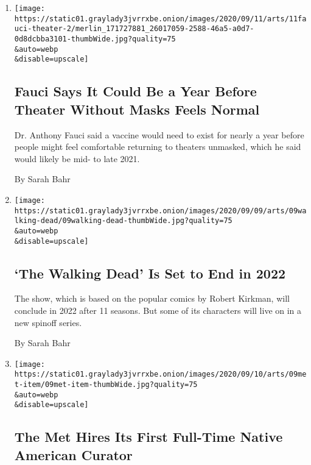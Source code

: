 \begin{enumerate}
\def\labelenumi{\arabic{enumi}.}
\item
  \href{/2020/09/11/theater/fauci-theater-reopen.html}{}

  \texttt{[image: https://static01.graylady3jvrrxbe.onion/images/2020/09/11/arts/11fauci-theater-2/merlin\_171727881\_26017059-2588-46a5-a0d7-0d8dcbba3101-thumbWide.jpg?quality=75\\\&auto=webp\\\&disable=upscale]}

  \hypertarget{fauci-says-it-could-be-a-year-before-theater-without-masks-feels-normal}{%
  \subsection{Fauci Says It Could Be a Year Before Theater Without Masks
  Feels
  Normal}\label{fauci-says-it-could-be-a-year-before-theater-without-masks-feels-normal}}

  Dr. Anthony Fauci said a vaccine would need to exist for nearly a year
  before people might feel comfortable returning to theaters unmasked,
  which he said would likely be mid- to late 2021.

  By Sarah Bahr
\item
  \href{/2020/09/09/arts/television/walking-dead-ending-spinoff.html}{}

  \texttt{[image: https://static01.graylady3jvrrxbe.onion/images/2020/09/09/arts/09walking-dead/09walking-dead-thumbWide.jpg?quality=75\\\&auto=webp\\\&disable=upscale]}

  \hypertarget{the-walking-dead-is-set-to-end-in-2022}{%
  \subsection{`The Walking Dead' Is Set to End in
  2022}\label{the-walking-dead-is-set-to-end-in-2022}}

  The show, which is based on the popular comics by Robert Kirkman, will
  conclude in 2022 after 11 seasons. But some of its characters will
  live on in a new spinoff series.

  By Sarah Bahr
\item
  \href{/2020/09/09/arts/design/met-museum-native-american-curator.html}{}

  \texttt{[image: https://static01.graylady3jvrrxbe.onion/images/2020/09/10/arts/09met-item/09met-item-thumbWide.jpg?quality=75\\\&auto=webp\\\&disable=upscale]}

  \hypertarget{the-met-hires-its-first-full-time-native-american-curator}{%
  \subsection{The Met Hires Its First Full-Time Native American
  Curator}\label{the-met-hires-its-first-full-time-native-american-curator}}


\end{enumerate}
